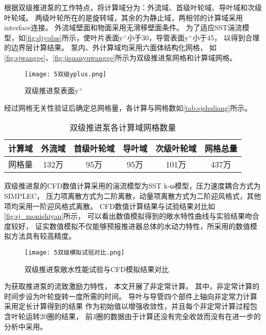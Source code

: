 根据双级推进泵的工作特点，将计算域分为：外流域、首级叶轮域、导叶域和次级叶轮域。
两级叶轮所在的是旋转域，其余的为静止域，两相邻的计算域采用interface连接。
外流域壁面和物面采用无滑移壁面条件。
为了适应SST湍流模型，如\autoref{fig:djyplus}所示，使叶片表面y$^+$小于30，导管表面y$^+$小于45，
以得到合理的边界层计算结果。
泵内、外计算域均采用六面体结构化网格，
如\autoref{fig:sjwangge}、\autoref{fig:jisuanyuwangge}所示为双级推进泵网格和计算域网格。
\begin{figure}[htbp]
    \centering
    \texttt{[image: 5双级yplus.png]}
    \caption{\label{fig:djyplus}双级推进泵表面y$^+$}
\end{figure}

经过网格无关性验证后确定总网格量，各计算与网格数如\autoref{tab:sjshuliang}所示。
\begin{table}[htbp]
    \centering
    \caption{\label{tab:sjshuliang}双级推进泵各计算域网格数量}
    \begin{tabular}{cccccc}
        \toprule
        计算域 & 外流域 & 首级叶轮域 & 导叶域 & 次级叶轮域 & 网格总量 \\
        \midrule
        网格量 & 132万 & 95万 & 95万 & 101万 & 437万 \\
        \bottomrule
    \end{tabular}
\end{table}

双级推进泵的CFD数值计算采用的湍流模型为SST k-ω模型，压力速度耦合方式为SIMPLEC，
压力项离散方式为二阶离散，动量项离散方式为二阶迎风格式，其他项均采用一阶迎风格式离散。
CFD数值计算结果与试验结果对比如\autoref{fig:sj_monishiyan}所示，
可以看出数值模拟得到的敞水特性曲线与实验结果吻合度较好，
证实数值模拟不仅能够预报推进器总体的水动力特性，所采用的数值模拟方法具有较高精度。
\begin{figure}[htbp]
    \centering
    \texttt{[image: 5双级模拟试验对比.png]}
    \caption{\label{fig:sj_monishiyan}双级推进泵敞水性能试验与CFD模拟结果对比}
\end{figure}

为获取推进泵的流致激励力特性，
本文开展了非定常计算。
其中，非定常计算的时间步设为叶轮旋转一度所需的时间。
导叶与导管四个部件上轴向非定常力计算采用定长计算得到的结果
作为初始值以增强收敛性，并且每个非定常计算过程包含叶轮运转20圈的结果，
前3圈的数据由于计算还没有完全收敛而没有在进一步的分析中采用。
